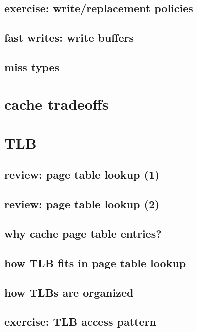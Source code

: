 \subsection{exercise: write/replacement policies}


\subsection{fast writes: write buffers}


\subsection{miss types}


\section{cache tradeoffs}


\section{TLB}

\subsection{review: page table lookup (1)}


\subsection{review: page table lookup (2)}

\subsection{why cache page table entries?}


\subsection{how TLB fits in page table lookup}


\subsection{how TLBs are organized}

\subsection{exercise: TLB access pattern}




